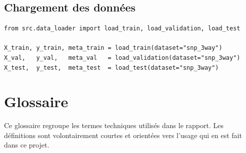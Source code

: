 \documentclass[11pt,a4paper]{article}
\begin{document}
\subsection{Chargement des données}

\begin{verbatim}
from src.data_loader import load_train, load_validation, load_test

X_train, y_train, meta_train = load_train(dataset="snp_3way")
X_val,   y_val,   meta_val   = load_validation(dataset="snp_3way")
X_test,  y_test,  meta_test  = load_test(dataset="snp_3way")
\end{verbatim}

\section{Glossaire}
\label{annexe:glossaire}

Ce glossaire regroupe les termes techniques utilisés dans le rapport. Les définitions sont volontairement courtes et orientées vers l'usage qui en est fait dans ce projet.
\end{document}
